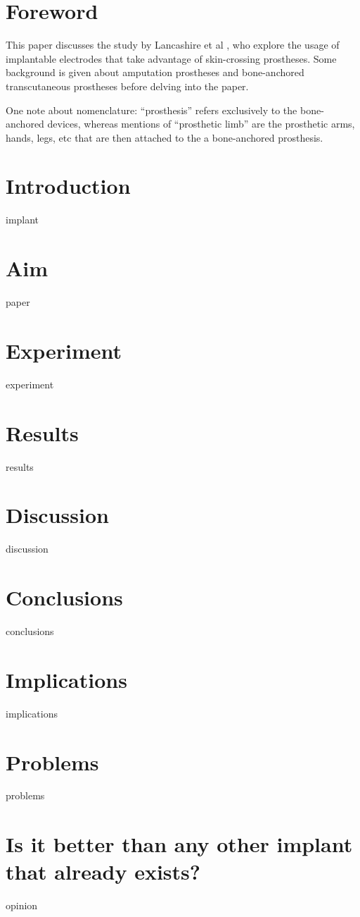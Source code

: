 \documentclass[oneside]{article}
\begin{document}

	\tableofcontents
	\clearpage
{}
\section{Foreword}
This paper discusses the study by Lancashire et al \cite{LancashireHenryT2019HERf}, who explore the usage of implantable electrodes that take advantage of skin-crossing prostheses. Some background is given about amputation prostheses and bone-anchored transcutaneous prostheses before delving into the paper.

One note about nomenclature: ``prosthesis'' refers exclusively to the bone-anchored devices, whereas mentions of ``prosthetic limb'' are the prosthetic arms, hands, legs, etc that are then attached to the a bone-anchored prosthesis.
\section{Introduction}
	{implant}
\section{Aim}
	{paper}
\section{Experiment}
	{experiment}
\section{Results}
	{results}
\section{Discussion}
	{discussion}
\section{Conclusions}
	{conclusions}
\section{Implications}
	{implications}
\section{Problems}
	{problems}
\section{Is it better than any other implant that already exists?}
	{opinion}

\clearpage
	
	
\end{document}
